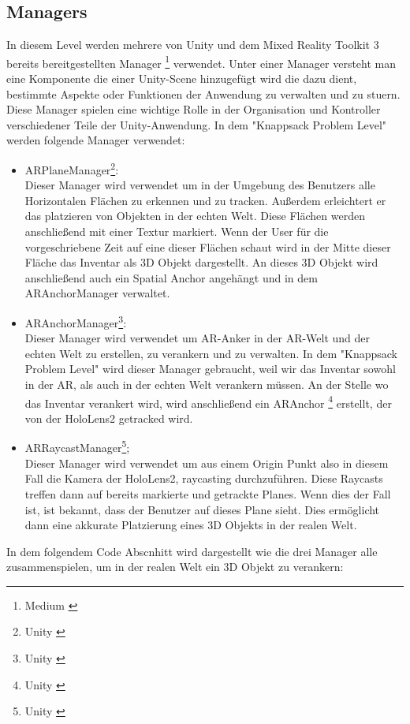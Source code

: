 \subsection{Managers}
In diesem Level werden mehrere von Unity und dem Mixed Reality Toolkit 3 bereits
bereitgestellten Manager \footnote{Medium \cite{Managers}} verwendet. Unter einer Manager
versteht man eine Komponente die einer Unity-Scene hinzugefügt wird die dazu dient,
bestimmte Aspekte oder Funktionen der Anwendung zu verwalten und zu stuern. Diese Manager
spielen eine wichtige Rolle in der Organisation und Kontroller verschiedener Teile der Unity-Anwendung.
In dem "Knappsack Problem Level" werden folgende Manager verwendet:
\begin{itemize}
    \item ARPlaneManager\footnote{Unity \cite{PlaneManager}}:\\
    Dieser Manager wird verwendet um in der Umgebung des Benutzers alle Horizontalen Flächen zu erkennen und zu tracken.
    Außerdem erleichtert er das platzieren von Objekten in der echten Welt.
    Diese Flächen werden anschließend mit einer Textur markiert. Wenn der User für die vorgeschriebene
    Zeit auf eine dieser Flächen schaut wird in der Mitte dieser Fläche das Inventar als 3D Objekt dargestellt. An dieses
    3D Objekt wird anschließend auch ein Spatial Anchor angehängt und in dem ARAnchorManager verwaltet.

    \item ARAnchorManager\footnote{Unity \cite{AnchorManager}}: \\
    Dieser Manager wird verwendet um AR-Anker in der AR-Welt und der echten Welt zu erstellen, zu verankern und zu verwalten.
    In dem "Knappsack Problem Level" wird dieser Manager gebraucht, weil wir das Inventar sowohl in der AR, als auch in
    der echten Welt verankern müssen. An der Stelle wo das Inventar verankert wird, wird anschließend ein ARAnchor \footnote{Unity \cite{Anchor}}
    erstellt, der von der HoloLens2 getracked wird.

    \item ARRaycastManager\footnote{Unity \cite{RaycastManager}}; \\
    Dieser Manager wird verwendet um aus einem Origin Punkt also in diesem Fall die Kamera der HoloLens2, raycasting durchzuführen.
    Diese Raycasts treffen dann auf bereits markierte und getrackte Planes. Wenn dies der Fall ist, ist bekannt, dass der
    Benutzer auf dieses Plane sieht. Dies ermöglicht dann eine akkurate Platzierung eines 3D Objekts in der realen Welt. \\

\end{itemize}
In dem folgendem Code Abscnhitt wird dargestellt wie die drei Manager alle zusammenspielen, um in der realen Welt
ein 3D Objekt zu verankern:

